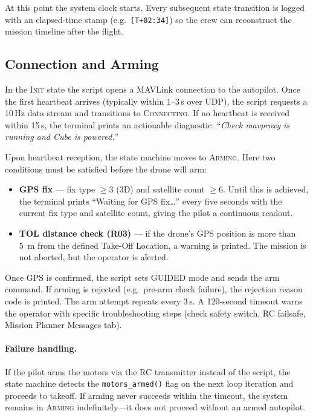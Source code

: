 \noindent At this point the system clock starts.  Every subsequent state transition is logged with an elapsed-time stamp (e.g.\ \texttt{[T+02:34]}) so the crew can reconstruct the mission timeline after the flight.

\subsection{Connection and Arming}\label{sec:mf-arming}

In the \textsc{Init} state the script opens a MAVLink connection to the autopilot.  Once the first heartbeat arrives (typically within 1--3\,s over UDP), the script requests a 10\,Hz data stream and transitions to \textsc{Connecting}.  If no heartbeat is received within 15\,s, the terminal prints an actionable diagnostic: ``\textit{Check mavproxy is running and Cube is powered.}''

Upon heartbeat reception, the state machine moves to \textsc{Arming}.  Here two conditions must be satisfied before the drone will arm:

\begin{itemize}
  \item \textbf{GPS fix} --- fix type $\geq 3$ (3D) and satellite count $\geq 6$.  Until this is achieved, the terminal prints ``Waiting for GPS fix\ldots'' every five seconds with the current fix type and satellite count, giving the pilot a continuous readout.
  \item \textbf{TOL distance check (R03)} --- if the drone's GPS position is more than \SI{5}{\metre} from the defined Take-Off Location, a warning is printed.  The mission is not aborted, but the operator is alerted.
\end{itemize}

\noindent Once GPS is confirmed, the script sets GUIDED mode and sends the arm command.  If arming is rejected (e.g.\ pre-arm check failure), the rejection reason code is printed.  The arm attempt repeats every 3\,s.  A 120-second timeout warns the operator with specific troubleshooting steps (check safety switch, RC failsafe, Mission Planner Messages tab).

\paragraph{Failure handling.}  If the pilot arms the motors via the RC transmitter instead of the script, the state machine detects the \texttt{motors\_armed()} flag on the next loop iteration and proceeds to takeoff.  If arming never succeeds within the timeout, the system remains in \textsc{Arming} indefinitely---it does not proceed without an armed autopilot.


